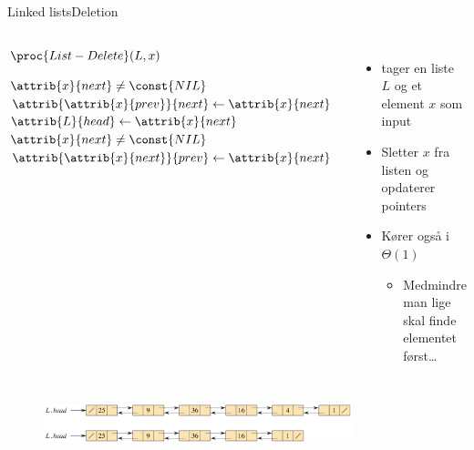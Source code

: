 \documentclass[aspectratio=1610]{beamer}
\begin{document}
\begin{frame}{Linked lists}{Deletion}
    \begin{columns}
        \small
        
        \begin{block}{$\proc{List-Delete}(L,x)$}

            \vspace{-\abovedisplayskip}
            \begin{codebox}
                \li \If $\attrib{x}{next} \neq \const{NIL}$
                    \Then
                \li     $\attrib{\attrib{x}{prev}}{next} \gets \attrib{x}{next}$
                \li \Else
                        $\attrib{L}{head} \gets \attrib{x}{next}$
                    \End
                \li \If $\attrib{x}{next} \neq \const{NIL}$
                    \Then
                \li     $\attrib{\attrib{x}{next}}{prev} \gets \attrib{x}{next}$
                    \End
            \end{codebox}
        \end{block}


        \begin{itemize}[<+->]
            \item {} tager en liste $L$ og et element $x$ som
                input
            \item Sletter $x$ fra listen og opdaterer pointers
            \item Kører også i $\Theta(1)$
                \begin{itemize}
                    \item Medmindre man lige skal finde elementet først\ldots
                \end{itemize}
        \end{itemize}

    \end{columns}

    \vspace{\abovedisplayskip}
    \begin{figure}[h]
        \centering
        \includegraphics[width=0.8\textwidth]{linked-list-example/linked-delete}
    \end{figure}

\end{frame}
\end{document}
